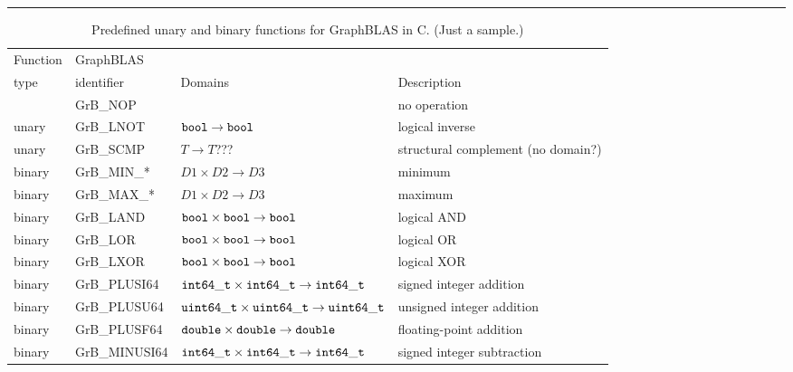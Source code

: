 \begin{table}
\hrule
\begin{center}
\caption{Predefined unary and binary functions for GraphBLAS in C. (Just a sample.)
}
\label{Tab:PredefinedFunctions}
\begin{tabular}{l|l|l|l}
Function & GraphBLAS           &                                                                      & \\
type     & identifier          & Domains                                                              & Description \\ \hline
         & {\sf GrB\_NOP}      &                                                                      & no operation \\
unary    & {\sf GrB\_LNOT}     & ${\tt bool} \rightarrow {\tt bool}$                                  & logical inverse \\
unary    & {\sf GrB\_SCMP}     & $T \rightarrow T $???                                                & structural complement (no domain?) \\
binary   & {\sf GrB\_MIN\_*}   & $D1 \times D2 \rightarrow D3 $                                       & minimum \\
binary   & {\sf GrB\_MAX\_*}   & $D1 \times D2 \rightarrow D3 $                                       & maximum \\
binary   & {\sf GrB\_LAND}     & ${\tt bool} \times {\tt bool} \rightarrow {\tt bool}$                & logical AND \\
binary   & {\sf GrB\_LOR}      & ${\tt bool} \times {\tt bool} \rightarrow {\tt bool}$                & logical OR \\
binary   & {\sf GrB\_LXOR}     & ${\tt bool} \times {\tt bool} \rightarrow {\tt bool}$                & logical XOR \\
binary   & {\sf GrB\_PLUSI64}  & ${\tt int64\_t} \times {\tt int64\_t} \rightarrow {\tt int64\_t}$    & signed integer addition \\
binary   & {\sf GrB\_PLUSU64}  & ${\tt uint64\_t} \times {\tt uint64\_t} \rightarrow {\tt uint64\_t}$ & unsigned integer addition \\
binary   & {\sf GrB\_PLUSF64}  & ${\tt double} \times {\tt double} \rightarrow {\tt double}$          & floating-point addition \\
binary   & {\sf GrB\_MINUSI64} & ${\tt int64\_t} \times {\tt int64\_t} \rightarrow {\tt int64\_t}$    & signed integer subtraction \\

\end{tabular}
\end{center}
\end{table}
